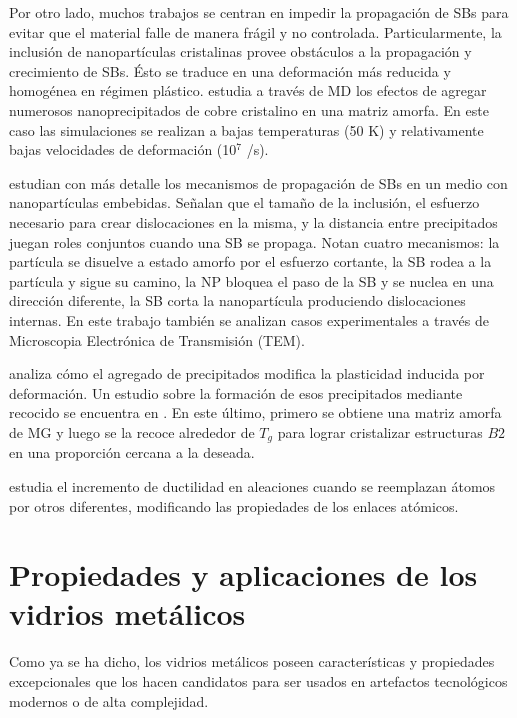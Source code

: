 Por otro lado, muchos trabajos se centran en impedir la propagación de SBs para evitar que el material falle de manera frágil y no controlada. Particularmente, la inclusión de nanopartículas cristalinas provee obstáculos a la propagación y crecimiento de SBs. Ésto se traduce en una deformación más reducida y homogénea en régimen plástico. \cite{albe13} estudia a través de MD los efectos de agregar numerosos nanoprecipitados de cobre cristalino en una matriz amorfa. En este caso las simulaciones se realizan a bajas temperaturas (50 K) y relativamente bajas velocidades de deformación (10$^{7}$ /s).

\cite{brink15} estudian con más detalle los mecanismos de propagación de SBs en un medio con nanopartículas embebidas. Señalan que el tamaño de la inclusión, el esfuerzo necesario para crear dislocaciones en la misma, y la distancia entre precipitados juegan roles conjuntos cuando una SB se propaga. Notan cuatro mecanismos: la partícula se disuelve a estado amorfo por el esfuerzo cortante, la SB rodea a la partícula y sigue su camino, la NP bloquea el paso de la SB y se nuclea en una dirección diferente, la SB corta la nanopartícula produciendo dislocaciones internas. En este trabajo también se analizan casos experimentales a través de Microscopia Electrónica de Transmisión (TEM).

\cite{kuo14} analiza cómo el agregado de precipitados modifica la plasticidad inducida por deformación. Un estudio sobre la formación de esos precipitados mediante recocido se encuentra en \cite{wei14}. En este último, primero se obtiene una matriz amorfa de MG y luego se la recoce alrededor de $T_{g}$ para lograr cristalizar estructuras $B2$ en una proporción cercana a la deseada.

\cite{Zheng12} estudia el incremento de ductilidad en aleaciones cuando se reemplazan átomos por otros diferentes, modificando las propiedades de los enlaces atómicos.


\section{Propiedades y aplicaciones de los vidrios metálicos}
\label{S1_4}

Como ya se ha dicho, los vidrios metálicos poseen características y propiedades excepcionales que los hacen candidatos para ser usados en artefactos tecnológicos modernos o de alta complejidad.

